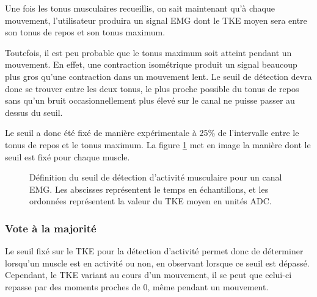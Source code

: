 \documentclass[letterpaper, twoside, 12pt, memoire, creativecommons, hyperref]{thETS}
\begin{document}
Une fois les tonus musculaires recueillis, on sait maintenant qu'à chaque mouvement, l'utilisateur produira un signal EMG dont le TKE moyen sera entre son tonus de repos et son tonus maximum. 

Toutefois, il est peu probable que le tonus maximum soit atteint pendant un mouvement. En effet, une contraction isométrique produit un signal beaucoup plus gros qu'une contraction dans un mouvement lent. Le seuil de détection devra donc se trouver entre les deux tonus, le plus proche possible du tonus de repos sans qu'un bruit occasionnellement plus élevé sur le canal ne puisse passer au dessus du seuil. 

Le seuil a donc été fixé de manière expérimentale à 25\% de l'intervalle entre le tonus de repos et le tonus maximum. La figure \ref{fig:seuilDetection} met en image la manière dont le seuil est fixé pour chaque muscle.

\begin{figure}
	\centering
	\caption{Définition du seuil de détection d'activité musculaire pour un canal EMG. Les abscisses représentent le temps en échantillons, et les ordonnées représentent la valeur du TKE moyen en unités ADC.}
	\label{fig:seuilDetection}
\end{figure}

\subsubsection{Vote à la majorité}
\label{CHvote}
Le seuil fixé sur le TKE pour la détection d'activité permet donc de déterminer lorsqu'un muscle est en activité ou non, en observant lorsque ce seuil est dépassé. Cependant, le TKE variant au cours d'un mouvement, il se peut que celui-ci repasse par des moments proches de 0, même pendant un mouvement.
\end{document}
